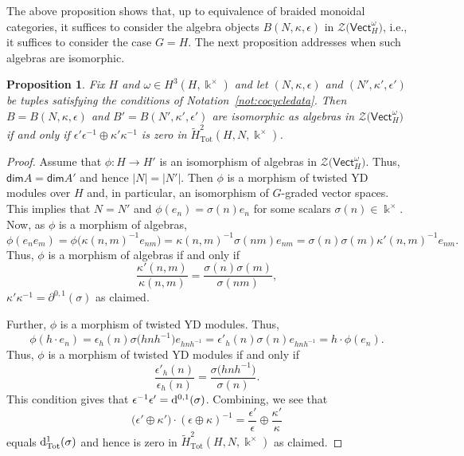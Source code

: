 \documentclass[pdftex]{sigma}
\numberwithin{equation}{section}
\newtheorem{Proposition}[Theorem]{Proposition}
 { \theoremstyle{definition}
\newtheorem{Definition}[Theorem]{Definition}
\newtheorem{Note}[Theorem]{Note}
\newtheorem{Notation}[Theorem]{Notation}
\newtheorem{Example}[Theorem]{Example}
\newtheorem{Remark}[Theorem]{Remark} }
\newcommand{\deri}{{\rm d}}
\newcommand{\Tot}{\mathrm{Tot}}
\renewcommand{\dim}{\mathsf{dim}}
\newcommand{\Vect}{\mathsf{Vect}}
\newcommand{\cZ}{\mathcal{Z}}
\begin{document}
The above proposition shows that, up to equivalence of braided monoidal categories, it suffices to consider the algebra objects $B(N,\kappa,\epsilon)$ in $\cZ\big(\Vect_H^\omega\big)$, i.e., it suffices to consider the case $G=H$. The next proposition addresses when such algebras are isomorphic.

\begin{Proposition} %
Fix $H$ and $\omega\in H^3(H,\Bbbk^\times)$ and let $(N,\kappa,\epsilon)$ and $(N',\kappa',\epsilon')$ be tuples satisfying the conditions of Notation~{\rm \ref{not:cocycledata}}. Then $B=B(N,\kappa,\epsilon)$ and $B'=B(N',\kappa',\epsilon')$ are isomorphic as algebras in $\cZ\big(\Vect_H^\omega\big)$ if and only if $\epsilon'\epsilon^{-1}\oplus \kappa'\kappa^{-1}$ is zero in $\widetilde{H}^2_{\Tot}(H,N,\Bbbk^\times)$.
\end{Proposition}
\begin{proof}
Assume that $\phi\colon H\to H'$ is an isomorphism of algebras in $\cZ\big(\Vect_H^\omega\big)$. Thus, $\dim A=\dim A'$ and hence $|N|=|N'|$.
Then $\phi$ is a morphism of twisted YD modules over $H$ and, in particular, an isomorphism of $G$-graded vector spaces.
This implies that $N=N'$ and $\phi(e_n)=\sigma(n) e_n$ for some scalars $\sigma(n)\in \Bbbk^\times$. Now, as $\phi$ is a morphism of algebras,
\[\phi(e_{n}e_{m})=\phi\big(\kappa(n,m)^{-1}e_{nm}\big)=\kappa(n,m)^{-1}\sigma(nm)e_{nm}=\sigma(n)\sigma(m)\kappa'(n,m)^{-1}e_{nm}.\]
Thus, $\phi$ is a morphism of algebras if and only if
\[\frac{\kappa'(n,m)}{\kappa(n,m)}=\frac{\sigma(n)\sigma(m)}{\sigma(nm)},\]
$\kappa'\kappa^{-1}=\partial^{0,1}(\sigma)$ as claimed.

Further, $\phi$ is a morphism of twisted YD modules. Thus,
\[\phi(h\cdot e_n)=\epsilon_h(n)\sigma\big(hnh^{-1}\big)e_{hnh^{-1}}=\epsilon'_h(n)\sigma(n)e_{hnh^{-1}}=h\cdot \phi(e_n).\]
Thus, $\phi$ is a morphism of twisted YD modules if and only if
\[\frac{\epsilon'_h(n)}{\epsilon_h(n)}=\frac{\sigma\big(hnh^{-1}\big)}{\sigma(n)}.\]
This condition gives that $\epsilon^{-1}\epsilon'=\deri^{0,1}(\sigma)$. Combining, we see that
 \[\big(\epsilon'\oplus \kappa'\big)\cdot (\epsilon\oplus \kappa)^{-1}=\frac{\epsilon'}{\epsilon}\oplus \frac{\kappa'}{\kappa} \]
equals $\deri^{1}_{\Tot}(\sigma)$ and hence is zero in $\widetilde{H}^2_{\Tot}(H,N,\Bbbk^\times)$ as claimed.
\end{proof}
\end{document}
